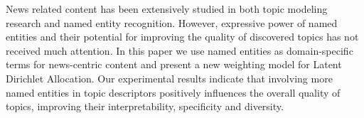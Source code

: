 News related content has been extensively studied in both topic modeling research and named entity recognition. However, expressive power of named entities and their potential for improving the quality of discovered topics has not received much attention. In this paper we use named entities as domain-specific terms for news-centric content and present a new weighting model for Latent Dirichlet Allocation. Our experimental results indicate that involving more named entities in topic descriptors positively influences the overall quality of topics, improving their interpretability, specificity and diversity.
